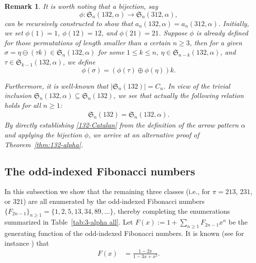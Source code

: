 \documentclass[12pt]{amsart}
\numberwithin{equation}{section}
\theoremstyle{plain}
\newtheorem{remark}[theorem]{Remark}
\def\fS{\mathfrak{S}}
\begin{document}
\begin{remark}
It is worth noting that a bijection, say 
$$\phi:\fS_n(132,\alpha)\to \fS_n(312,\alpha),$$
can be recursively constructed to show that $a_n(132,\alpha)=a_n(312,\alpha)$. Initially, we set $\phi(1)=1$, $\phi(12)=12$, and $\phi(21)=21$. Suppose $\phi$ is already defined for those permutations of length smaller than a certain $n\ge 3$, then for a given $\sigma=\eta\ominus(\tau k)\in\fS_n(132,\alpha)$ for some $1\le k\le n$, $\eta\in\fS_{n-k}(132,\alpha)$, and $\tau\in\fS_{k-1}(132,\alpha)$, we define 
$$\phi(\sigma)=(\phi(\tau)\oplus\phi(\eta))k.$$

Furthermore, it is well-known that $|\fS_n(132)|=C_n$. In view of the trivial inclusion $\fS_n(132,\alpha)\subseteq\fS_n(132)$, we see that actually the following relation holds for all $n\ge 1$:
\begin{align}\label{132-Catalan}
	\fS_n(132)=\fS_n(132,\alpha).
\end{align}
By directly establishing \eqref{132-Catalan} from the definition of the arrow pattern $\alpha$ and applying the bijection $\phi$, we arrive at an alternative proof of Theorem~\ref{thm:132-alpha}.
\end{remark}

\subsection{The odd-indexed Fibonacci numbers}

In this subsection we show that the remaining three classes (i.e., for $\pi=213$, $231$, or $321$) are all enumerated by the odd-indexed Fibonacci numbers $\{F_{2n-1}\}_{n\ge 1}=\{1,2,5,13,34,89,\ldots\}$, thereby completing the enumerations summarized in Table~\ref{tab:3-alpha all}. Let $F(x):=1+\sum_{n\ge 1}F_{2n-1}x^n$ be the generating function of the odd-indexed Fibonacci numbers. It is known (see for instance \cite[Eq.~(2.2.7)]{Wil2005}) that
\begin{align}\label{gf:oddFibo}
	F(x) &= \frac{1-2x}{1-3x+x^2}.
\end{align}
\end{document}
